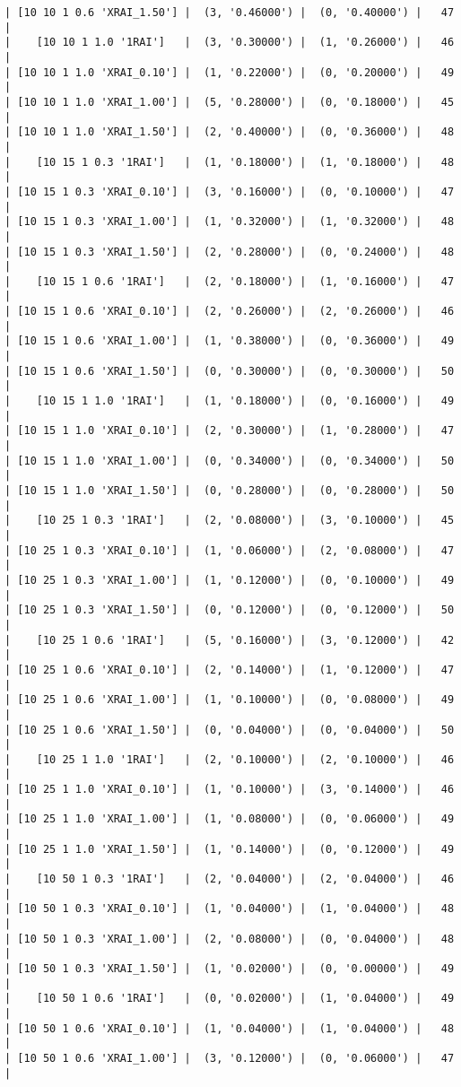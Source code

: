 \documentclass{article}
\begin{document}
\begin{verbatim}
| [10 10 1 0.6 'XRAI_1.50'] |  (3, '0.46000') |  (0, '0.40000') |   47  |
|    [10 10 1 1.0 '1RAI']   |  (3, '0.30000') |  (1, '0.26000') |   46  |
| [10 10 1 1.0 'XRAI_0.10'] |  (1, '0.22000') |  (0, '0.20000') |   49  |
| [10 10 1 1.0 'XRAI_1.00'] |  (5, '0.28000') |  (0, '0.18000') |   45  |
| [10 10 1 1.0 'XRAI_1.50'] |  (2, '0.40000') |  (0, '0.36000') |   48  |
|    [10 15 1 0.3 '1RAI']   |  (1, '0.18000') |  (1, '0.18000') |   48  |
| [10 15 1 0.3 'XRAI_0.10'] |  (3, '0.16000') |  (0, '0.10000') |   47  |
| [10 15 1 0.3 'XRAI_1.00'] |  (1, '0.32000') |  (1, '0.32000') |   48  |
| [10 15 1 0.3 'XRAI_1.50'] |  (2, '0.28000') |  (0, '0.24000') |   48  |
|    [10 15 1 0.6 '1RAI']   |  (2, '0.18000') |  (1, '0.16000') |   47  |
| [10 15 1 0.6 'XRAI_0.10'] |  (2, '0.26000') |  (2, '0.26000') |   46  |
| [10 15 1 0.6 'XRAI_1.00'] |  (1, '0.38000') |  (0, '0.36000') |   49  |
| [10 15 1 0.6 'XRAI_1.50'] |  (0, '0.30000') |  (0, '0.30000') |   50  |
|    [10 15 1 1.0 '1RAI']   |  (1, '0.18000') |  (0, '0.16000') |   49  |
| [10 15 1 1.0 'XRAI_0.10'] |  (2, '0.30000') |  (1, '0.28000') |   47  |
| [10 15 1 1.0 'XRAI_1.00'] |  (0, '0.34000') |  (0, '0.34000') |   50  |
| [10 15 1 1.0 'XRAI_1.50'] |  (0, '0.28000') |  (0, '0.28000') |   50  |
|    [10 25 1 0.3 '1RAI']   |  (2, '0.08000') |  (3, '0.10000') |   45  |
| [10 25 1 0.3 'XRAI_0.10'] |  (1, '0.06000') |  (2, '0.08000') |   47  |
| [10 25 1 0.3 'XRAI_1.00'] |  (1, '0.12000') |  (0, '0.10000') |   49  |
| [10 25 1 0.3 'XRAI_1.50'] |  (0, '0.12000') |  (0, '0.12000') |   50  |
|    [10 25 1 0.6 '1RAI']   |  (5, '0.16000') |  (3, '0.12000') |   42  |
| [10 25 1 0.6 'XRAI_0.10'] |  (2, '0.14000') |  (1, '0.12000') |   47  |
| [10 25 1 0.6 'XRAI_1.00'] |  (1, '0.10000') |  (0, '0.08000') |   49  |
| [10 25 1 0.6 'XRAI_1.50'] |  (0, '0.04000') |  (0, '0.04000') |   50  |
|    [10 25 1 1.0 '1RAI']   |  (2, '0.10000') |  (2, '0.10000') |   46  |
| [10 25 1 1.0 'XRAI_0.10'] |  (1, '0.10000') |  (3, '0.14000') |   46  |
| [10 25 1 1.0 'XRAI_1.00'] |  (1, '0.08000') |  (0, '0.06000') |   49  |
| [10 25 1 1.0 'XRAI_1.50'] |  (1, '0.14000') |  (0, '0.12000') |   49  |
|    [10 50 1 0.3 '1RAI']   |  (2, '0.04000') |  (2, '0.04000') |   46  |
| [10 50 1 0.3 'XRAI_0.10'] |  (1, '0.04000') |  (1, '0.04000') |   48  |
| [10 50 1 0.3 'XRAI_1.00'] |  (2, '0.08000') |  (0, '0.04000') |   48  |
| [10 50 1 0.3 'XRAI_1.50'] |  (1, '0.02000') |  (0, '0.00000') |   49  |
|    [10 50 1 0.6 '1RAI']   |  (0, '0.02000') |  (1, '0.04000') |   49  |
| [10 50 1 0.6 'XRAI_0.10'] |  (1, '0.04000') |  (1, '0.04000') |   48  |
| [10 50 1 0.6 'XRAI_1.00'] |  (3, '0.12000') |  (0, '0.06000') |   47  |

\end{verbatim}
\end{document}
